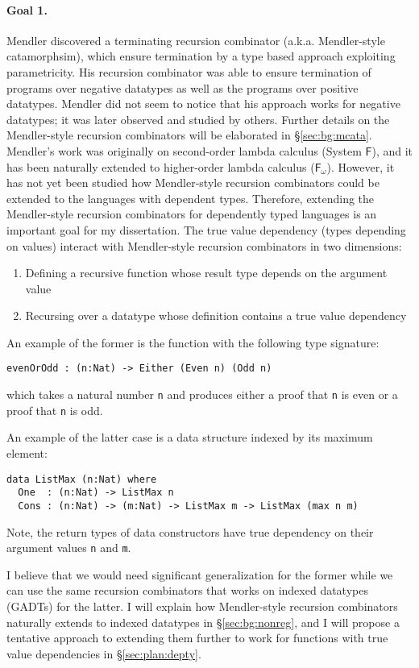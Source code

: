 \documentclass[letterpaper,12pt]{article}
\newcommand{\Fw}[0]{\ensuremath{\mathsf{F}_{\!\omega}}}
\begin{document}
\paragraph{Goal 1.}
Mendler discovered a terminating recursion combinator
(a.k.a. Mendler-style catamorphsim), which ensure termination
by a type based approach exploiting parametricity.
His recursion combinator was able to ensure termination of programs
over negative datatypes as well as the programs over positive datatypes.
Mendler did not seem to notice that his approach works for negative datatypes;
it was later observed and studied by others.
Further details on the Mendler-style recursion combinators will be elaborated
in \S\ref{sec:bg:mcata}.
Mendler's work was originally on second-order lambda calculus
(System $\mathsf{F}$), and it has been naturally extended to
higher-order lambda calculus (\Fw).
However, it has not yet been studied how Mendler-style recursion combinators
could be extended to the languages with dependent types.
Therefore, extending the Mendler-style recursion combinators for
dependently typed languages is an important goal for my dissertation.
The true value dependency (types depending on values) interact with
Mendler-style recursion combinators in two dimensions:
\begin{enumerate}
 \item Defining a recursive function
       whose result type depends on the argument value
 \item Recursing over a datatype whose definition contains a true value dependency
\end{enumerate}

An example of the former is the function with the following type signature:
\begin{verbatim}
evenOrOdd : (n:Nat) -> Either (Even n) (Odd n) 
\end{verbatim}
which takes a natural number \verb|n| and
produces either a proof that \verb|n| is  even or a proof that \verb|n| is odd.

An example of the latter case is a data structure indexed by its maximum
element:
\begin{verbatim}
data ListMax (n:Nat) where
  One  : (n:Nat) -> ListMax n
  Cons : (n:Nat) -> (m:Nat) -> ListMax m -> ListMax (max n m)
\end{verbatim}
Note, the return types of data constructors have true dependency on their
argument values \verb|n| and \verb|m|.

I believe that we would need significant generalization for the former
while we can use the same recursion combinators that works on indexed datatypes
(GADTs) for the latter.  I will explain how Mendler-style recursion combinators
naturally extends to indexed datatypes in \S\ref{sec:bg:nonreg}, and
I will propose a tentative approach to extending them further to work for
functions with true value dependencies in \S\ref{sec:plan:depty}.
\end{document}
